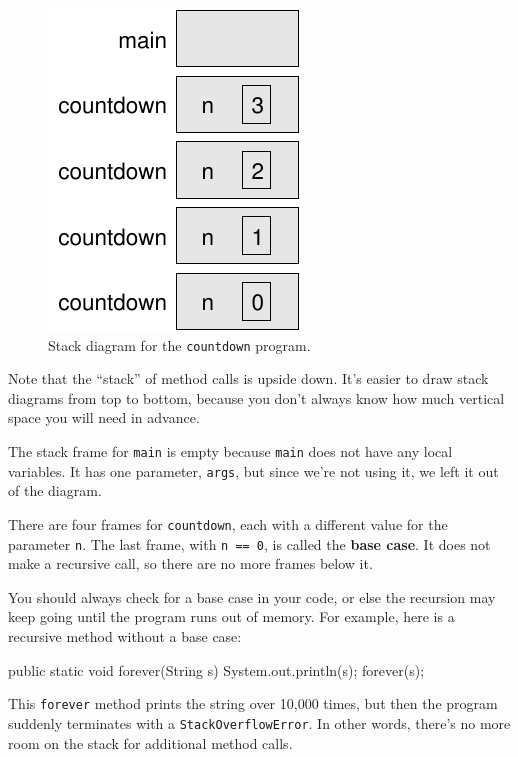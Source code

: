 \documentclass[12pt]{book}
\theoremstyle{exercise}
\newcommand{\java}[1]{\verb"#1"}
\newcommand{\java}[1]{\lstinline{#1}} %
\begin{document}
\begin{figure}[!h]
\begin{center}
\includegraphics{figs/stack2.pdf}
\caption{Stack diagram for the \java{countdown} program.}
\end{center}
\end{figure}

Note that the ``stack'' of method calls is upside down.
It's easier to draw stack diagrams from top to bottom, because you don't always know how much vertical space you will need in advance.

The stack frame for \java{main} is empty because \java{main} does not have any local variables.
It has one parameter, \java{args}, but since we're not using it, we left it out of the diagram.

There are four frames for \java{countdown}, each with a different value for the parameter \java{n}.
The last frame, with \java{n == 0}, is called the {\bf base case}.
It does not make a recursive call, so there are no more frames below it.

You should always check for a base case in your code, or else the recursion may keep going until the program runs out of memory.
For example, here is a recursive method without a base case:

\begin{code}
    public static void forever(String s) {
        System.out.println(s);
        forever(s);
    }
\end{code}


This \java{forever} method prints the string over 10,000 times, but then the program suddenly terminates with a \java{StackOverflowError}.
In other words, there's no more room on the stack for additional method calls.
\end{document}

